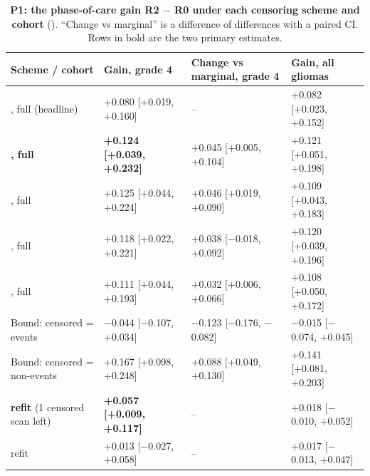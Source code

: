 \documentclass[11pt,a4paper]{article}
\begin{document}
\begin{table}[H]
\centering
\footnotesize
\renewcommand{\thetable}{S30}\renewcommand{\theHtable}{S30}
\caption{\textbf{P1: the phase-of-care gain R2 $-$ R0 under each censoring scheme and cohort}
(). ``Change vs marginal'' is a difference of differences with a paired CI. Rows
in bold are the two primary estimates.}
\label{tab:S30}
\begin{tabularx}{\linewidth}{@{}L R{3.5cm} R{3.5cm} R{3.5cm}@{}}
\toprule
Scheme / cohort & Gain, grade 4 & Change vs marginal, grade 4 & Gain, all gliomas \\
\midrule
{}, full (headline) & +0.080 [+0.019, +0.160] & -- & +0.082 [+0.023, +0.152] \\
\textbf{, full} & \textbf{+0.124 [+0.039, +0.232]} & +0.045 [+0.005, +0.104] & +0.121 [+0.051, +0.198] \\
, full & +0.125 [+0.044, +0.224] & +0.046 [+0.019, +0.090] & +0.109 [+0.043, +0.183] \\
, full & +0.118 [+0.022, +0.221] & +0.038 [$-$0.018, +0.092] & +0.120 [+0.039, +0.196] \\
, full & +0.111 [+0.044, +0.193] & +0.032 [+0.006, +0.066] & +0.108 [+0.050, +0.172] \\
Bound: censored = events & $-$0.044 [$-$0.107, +0.034] & $-$0.123 [$-$0.176, $-$0.082] & $-$0.015 [$-$0.074, +0.045] \\
Bound: censored = non-events & +0.167 [+0.098, +0.248] & +0.088 [+0.049, +0.130] & +0.141 [+0.081, +0.203] \\
\textbf{ refit} (1 censored scan left) & \textbf{+0.057 [+0.009, +0.117]} & -- & +0.018 [$-$0.010, +0.052] \\
 refit & +0.013 [$-$0.027, +0.058] & -- & +0.017 [$-$0.013, +0.047] \\
\bottomrule
\end{tabularx}
\end{table}
\end{document}
